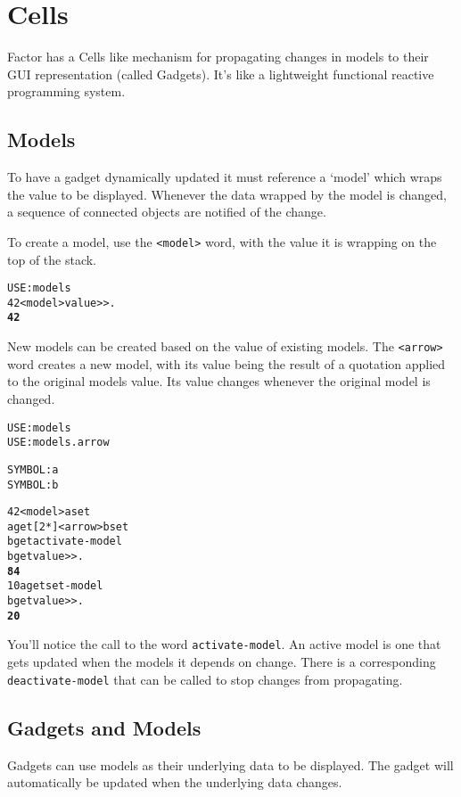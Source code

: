 \chapter{Cells}\label{cells}

Factor has a Cells like mechanism for propagating changes in models to
their GUI representation (called Gadgets). It's like a lightweight
functional reactive programming system. 

\section{Models}
To have a gadget dynamically updated it must reference a `model' which
wraps the value to be displayed. Whenever the data wrapped by the
model is changed, a sequence of connected objects are notified of the
change.  

To create a model, use the \verb|<model>| word, with the value it is wrapping
on the top of the stack.

\begin{alltt}
USE: models
42 <model> value>> .
  \textbf{42}
\end{alltt}

New models can be created based on the value of existing models. The \verb|<arrow>| word creates a new model, with its value being the result of a quotation applied to the original models value. Its value changes whenever the original model is changed.
\begin{alltt}
USE: models
USE: models.arrow

SYMBOL: a
SYMBOL: b

42 <model> a set
a get [ 2 * ] <arrow> b set
b get activate-model
b get value>> .
  \textbf{84}
10 a get set-model
b get value>> .
  \textbf{20}
\end{alltt}
You'll notice the call to the word \verb|activate-model|. An active model is one that gets updated when the models it depends on change. There is a corresponding \verb|deactivate-model| that can be called to stop changes from propagating.



\section{Gadgets and Models}
Gadgets can use models as their underlying data to be displayed. The gadget will automatically be updated when the underlying data changes. 

